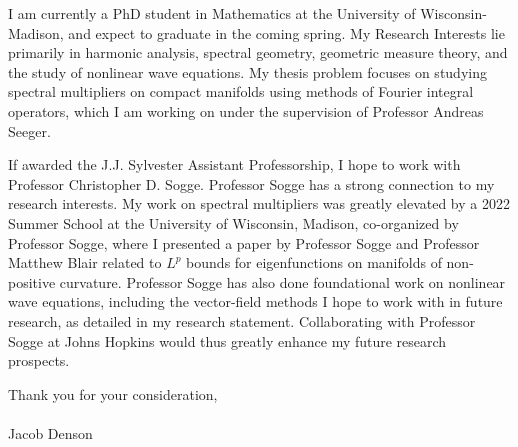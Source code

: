 \documentclass[11pt,stdletter,orderfromtodate,sigleft]{newlfm}
\begin{document}
\begin{newlfm}

I am currently a PhD student in Mathematics at the University of Wisconsin-Madison, and expect to graduate in the coming spring. My Research Interests lie primarily in harmonic analysis, spectral geometry, geometric measure theory, and the study of nonlinear wave equations. My thesis problem focuses on studying spectral multipliers on compact manifolds using methods of Fourier integral operators, which I am working on under the supervision of Professor Andreas Seeger.

If awarded the J.J. Sylvester Assistant Professorship, I hope to work with Professor Christopher D. Sogge. Professor Sogge has a strong connection to my research interests. My work on spectral multipliers was greatly elevated by a 2022 Summer School at the University of Wisconsin, Madison, co-organized by Professor Sogge, where I presented a paper by Professor Sogge and Professor Matthew Blair related to $L^p$ bounds for eigenfunctions on manifolds of non-positive curvature. Professor Sogge has also done foundational work on nonlinear wave equations, including the vector-field methods I hope to work with in future research, as detailed in my research statement. Collaborating with Professor Sogge at Johns Hopkins would thus greatly enhance my future research prospects.

Thank you for your consideration,\\\\
Jacob Denson

\end{newlfm}
\end{document}

